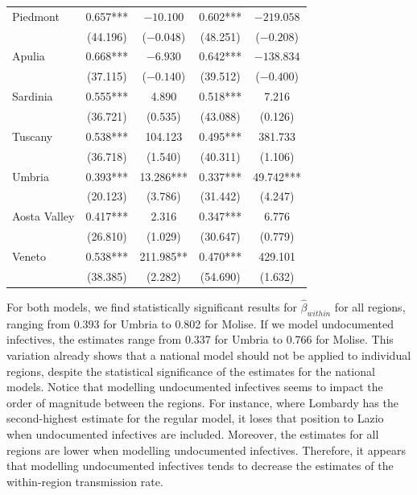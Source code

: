 \documentclass[12pt]{article}
\begin{document}
\begin{longtable}{@{}lcccc@{}}
        Piedmont & 0.657*** & $-10.100$ & 0.602*** & $-219.058$ \\ 
         & (44.196) & ($-0.048$) & (48.251) & ($-0.208$) \\ 
        Apulia & 0.668*** & $-6.930$ & 0.642*** & $-138.834$ \\ 
         & (37.115) & ($-0.140$) & (39.512) & ($-0.400$) \\ 
        Sardinia & 0.555*** & 4.890 & 0.518*** & 7.216 \\ 
         & (36.721) & (0.535) & (43.088) & (0.126) \\ 
        Tuscany & 0.538*** & 104.123 & 0.495*** & 381.733 \\ 
         & (36.718) & (1.540) & (40.311) & (1.106) \\ 
        Umbria & 0.393*** & 13.286*** & 0.337*** & 49.742*** \\ 
         & (20.123) & (3.786) & (31.442) & (4.247) \\ 
        Aosta Valley & 0.417*** & 2.316 & 0.347*** & 6.776 \\ 
         & (26.810) & (1.029) & (30.647) & (0.779) \\ 
        Veneto & 0.538*** & 211.985** & 0.470*** & 429.101 \\  
         & (38.385) & (2.282) & (54.690) & (1.632) \\* \bottomrule
	\end{longtable}

    For both models, we find statistically significant results for $\widehat{\beta}_{within}$ for all regions, ranging from 0.393 for Umbria to 0.802 for Molise. If we model undocumented infectives, the estimates range from 0.337 for Umbria to 0.766 for Molise. This variation already shows that a national model should not be applied to individual regions, despite the statistical significance of the estimates for the national models. Notice that modelling undocumented infectives seems to impact the order of magnitude between the regions. For instance, where Lombardy has the second-highest estimate for the regular model, it loses that position to Lazio when undocumented infectives are included. Moreover, the estimates for all regions are lower when modelling undocumented infectives. Therefore, it appears that modelling undocumented infectives tends to decrease the estimates of the within-region transmission rate.
    \\
\end{document}
